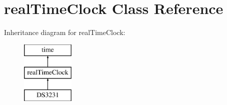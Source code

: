 \hypertarget{classreal_time_clock}{}\section{real\+Time\+Clock Class Reference}
\label{classreal_time_clock}
Inheritance diagram for real\+Time\+Clock\+:\begin{figure}[H]
\begin{center}
\leavevmode
\includegraphics[height=3.000000cm]{classreal_time_clock}
\end{center}
\end{figure}
